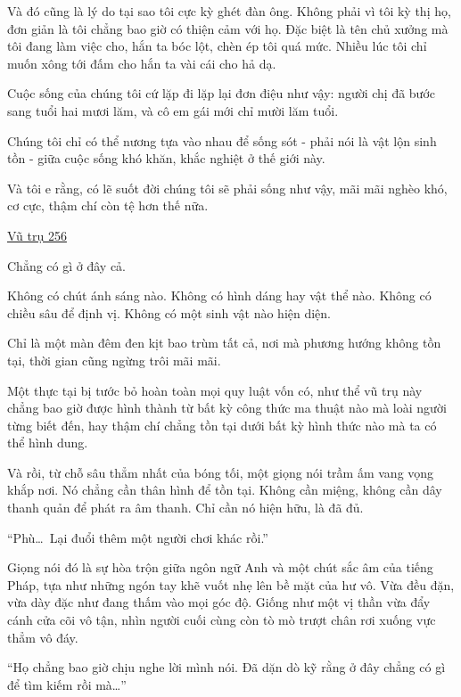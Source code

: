 \documentclass[../main.tex]{subfiles}
\begin{document}
Và đó cũng là lý do tại sao tôi cực kỳ ghét đàn ông. Không phải vì tôi kỳ thị họ, đơn giản là tôi chẳng bao giờ có thiện cảm với họ. Đặc biệt là tên chủ xưởng mà tôi đang làm việc cho, hắn ta bóc lột, chèn ép tôi quá mức. Nhiều lúc tôi chỉ muốn xông tới đấm cho hắn ta vài cái cho hả dạ.

Cuộc sống của chúng tôi cứ lặp đi lặp lại đơn điệu như vậy: người chị đã bước sang tuổi hai mươi lăm, và cô em gái mới chỉ mười lăm tuổi.

Chúng tôi chỉ có thể nương tựa vào nhau để sống sót - phải nói là vật lộn sinh tồn - giữa cuộc sống khó khăn, khắc nghiệt ở thế giới này.

Và tôi e rằng, có lẽ suốt đời chúng tôi sẽ phải sống như vậy, mãi mãi nghèo khó, cơ cực, thậm chí còn tệ hơn thế nữa.

\begin{center}
  \pov{-}
  \uline{Vũ trụ 256}
\end{center}


Chẳng có gì ở đây cả.

Không có chút ánh sáng nào. Không có hình dáng hay vật thể nào. Không có chiều sâu để định vị. Không có một sinh vật nào hiện diện.

Chỉ là một màn đêm đen kịt bao trùm tất cả, nơi mà phương hướng không tồn tại, thời gian cũng ngừng trôi mãi mãi.

Một thực tại bị tước bỏ hoàn toàn mọi quy luật vốn có, như thể vũ trụ này chẳng bao giờ được hình thành từ bất kỳ công thức ma thuật nào mà loài người từng biết đến, hay thậm chí chẳng tồn tại dưới bất kỳ hình thức nào mà ta có thể hình dung.

Và rồi, từ chỗ sâu thẳm nhất của bóng tối, một giọng nói trầm ấm vang vọng khắp nơi. Nó chẳng cần thân hình để tồn tại. Không cần miệng, không cần dây thanh quản để phát ra âm thanh. Chỉ cần nó hiện hữu, là đã đủ.

``Phù\dots\ Lại đuổi thêm một người chơi khác rồi.''

Giọng nói đó là sự hòa trộn giữa ngôn ngữ Anh và một chút sắc âm của tiếng Pháp, tựa như những ngón tay khẽ vuốt nhẹ lên bề mặt của hư vô. Vừa đều đặn, vừa dày đặc như đang thấm vào mọi góc độ. Giống như một vị thần vừa đẩy cánh cửa cõi vô tận, nhìn người cuối cùng còn tò mò trượt chân rơi xuống vực thẳm vô đáy.

``Họ chẳng bao giờ chịu nghe lời mình nói. Đã dặn dò kỹ rằng ở đây chẳng có gì để tìm kiếm rồi mà\dots''
\end{document}
